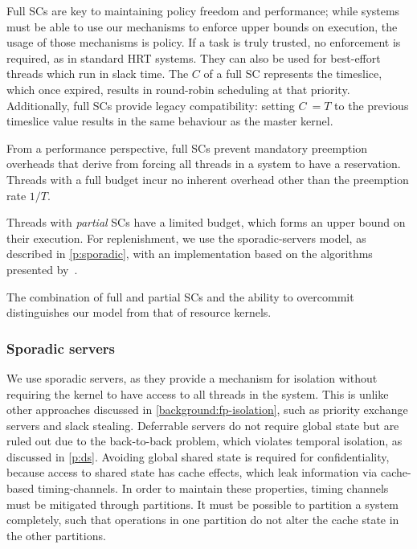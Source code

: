 Full \glspl{SC} are key to maintaining policy freedom and performance; while systems
must be able to use our mechanisms to enforce upper bounds on execution, the usage of 
those mechanisms is policy. If a task is truly trusted, no enforcement is required,
as in standard \gls{HRT} systems. They can also be used for best-effort threads which run in slack time.
The \(C\) of a full \gls{SC} represents the timeslice, which once expired, results in round-robin
scheduling at that priority. Additionally, full \glspl{SC} provide legacy compatibility: setting
\(C\ = T\) to
the previous timeslice value results in the same behaviour as the master kernel. 

From a performance perspective, full \glspl{SC} prevent mandatory preemption overheads 
that derive from forcing all threads in a system to have a reservation. Threads with a full
budget incur no inherent overhead other than the preemption rate $1/T$.

Threads with \emph{partial} \glspl{SC} have a limited budget, which forms an upper
bound on their execution. For replenishment, we
use the sporadic-servers model, as described in \cref{p:sporadic}, with an
implementation based on the algorithms presented
by~\citet{Stanovic_BWH_10}. 

The combination of full and partial \glspl{SC}  and the ability to overcommit distinguishes our
model from that of resource kernels.

\subsubsection{Sporadic servers}
\label{sec:model-sporadic}

We use sporadic servers, as they provide a mechanism for isolation without requiring the kernel
to have access to all threads in the system. This is unlike other approaches discussed in
\cref{background:fp-isolation}, such as  priority exchange servers and slack stealing.
Deferrable servers do not require global state but are ruled out due to the back-to-back
problem, which violates temporal isolation, as discussed in \cref{p:ds}. Avoiding global shared state is required for confidentiality, because access to shared state
has cache effects, which leak information via cache-based timing-channels. In order to maintain these properties,
timing channels must be mitigated through partitions. 
It must be possible to partition a system completely, such that operations in one partition do not
alter the cache state in the other partitions.


